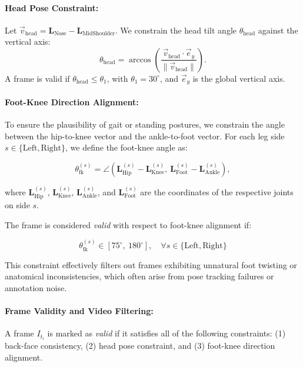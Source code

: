 \documentclass[a4paper,12pt]{article}
\begin{document}
\paragraph{Head Pose Constraint:}
Let $\vec{v}_{\text{head}} = \mathbf{L}_{\text{Nose}} - \mathbf{L}_{\text{MidShoulder}}$.
We constrain the head tilt angle $\theta_{\text{head}}$ against the vertical axis:
\begin{equation}
\theta_{\text{head}} = \arccos \left( \frac{\vec{v}_{\text{head}} \cdot \vec{e}_y}{\|\vec{v}_{\text{head}}\|} \right).
\end{equation}
%
A frame is valid if $\theta_{\text{head}} \leq \theta_1$, with $\theta_1 = 30^\circ$, and $\vec{e}_y$ is the global vertical axis.


\paragraph{Foot-Knee Direction Alignment:}

To ensure the plausibility of gait or standing postures, we constrain the angle between the hip-to-knee vector and the ankle-to-foot vector. For each leg side $s \in \{\text{Left}, \text{Right}\}$, we define the foot-knee angle as:

\begin{equation}
\theta_{\text{fk}}^{(s)} = \angle \left( \mathbf{L}_{\text{Hip}}^{(s)} - \mathbf{L}_{\text{Knee}}^{(s)},\ \mathbf{L}_{\text{Foot}}^{(s)} - \mathbf{L}_{\text{Ankle}}^{(s)} \right),
\end{equation}

where $\mathbf{L}_{\text{Hip}}^{(s)}$, $\mathbf{L}_{\text{Knee}}^{(s)}$, $\mathbf{L}_{\text{Ankle}}^{(s)}$, and $\mathbf{L}_{\text{Foot}}^{(s)}$ are the coordinates of the respective joints on side $s$.

The frame is considered \emph{valid} with respect to foot-knee alignment if:

\begin{equation}
\theta_{\text{fk}}^{(s)} \in [75^\circ,\ 180^\circ], \quad \forall s \in \{\text{Left}, \text{Right}\}
\end{equation}

This constraint effectively filters out frames exhibiting unnatural foot twisting or anatomical inconsistencies, which often arise from pose tracking failures or annotation noise.


\paragraph{Frame Validity and Video Filtering:}
\label{filter_method}
A frame $I_{t_i}$ is marked as \textit{valid} if it satisfies all of the following constraints:
(1) back-face consistency,
(2) head pose constraint, and
(3) foot-knee direction alignment.
\end{document}
